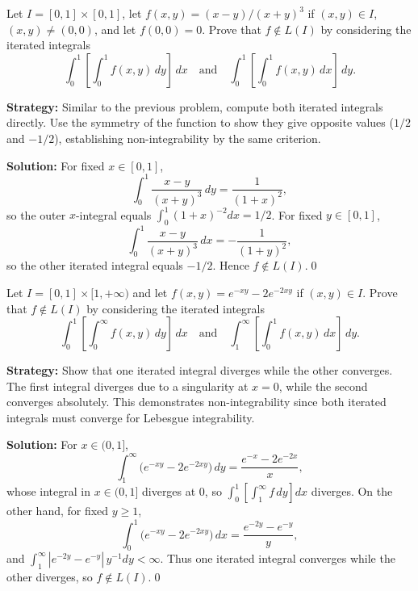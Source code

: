 \begin{problembox}
\begin{problemstatement}
Let \( I = [0, 1] \times [0, 1] \), let \( f(x, y) = (x - y)/(x + y)^3 \) if \( (x, y) \in I \), \( (x, y) \neq (0, 0) \), and let \( f(0, 0) = 0 \). Prove that \( f \notin L(I) \) by considering the iterated integrals
\[
\int_0^1 \left[ \int_0^1 f(x, y) \, dy \right] \, dx \quad \text{and} \quad \int_0^1 \left[ \int_0^1 f(x, y) \, dx \right] \, dy.
\]
\end{problemstatement}
\end{problembox}

\noindent\textbf{Strategy:} Similar to the previous problem, compute both iterated integrals directly. Use the symmetry of the function to show they give opposite values (\(1/2\) and \(-1/2\)), establishing non-integrability by the same criterion.

\bigskip\noindent\textbf{Solution:}
For fixed \(x\in[0,1]\),
\[
\int_0^1 \frac{x-y}{(x+y)^3}\,dy = \frac{1}{(1+x)^{2}},
\]
so the outer \(x\)-integral equals \(\int_0^1 (1+x)^{-2}dx=1/2\). For fixed \(y\in[0,1]\),
\[
\int_0^1 \frac{x-y}{(x+y)^3}\,dx = -\frac{1}{(1+y)^{2}},
\]
so the other iterated integral equals \(-1/2\). Hence \(f\notin L(I)\).\qed


\begin{problembox}
\begin{problemstatement}
Let \( I = [0, 1] \times [1, +\infty) \) and let \( f(x, y) = e^{-xy} - 2e^{-2xy} \) if \( (x, y) \in I \). Prove that \( f \notin L(I) \) by considering the iterated integrals
\[
\int_0^1 \left[ \int_0^\infty f(x, y) \, dy \right] \, dx \quad \text{and} \quad \int_1^\infty \left[ \int_0^1 f(x, y) \, dx \right] \, dy.
\]
\end{problemstatement}
\end{problembox}

\noindent\textbf{Strategy:} Show that one iterated integral diverges while the other converges. The first integral diverges due to a singularity at \(x=0\), while the second converges absolutely. This demonstrates non-integrability since both iterated integrals must converge for Lebesgue integrability.

\bigskip\noindent\textbf{Solution:}
For \(x\in(0,1]\),
\[
\int_1^{\infty} \big(e^{-xy}-2e^{-2xy}\big)\,dy = \frac{e^{-x}-2e^{-2x}}{x},
\]
whose integral in \(x\in(0,1]\) diverges at 0, so \(\int_0^1[\int_1^{\infty} f\,dy]dx\) diverges. On the other hand, for fixed \(y\ge 1\),
\[
\int_0^1 \big(e^{-xy}-2e^{-2xy}\big)\,dx = \frac{e^{-2y}-e^{-y}}{y},
\]
and \(\int_1^{\infty} |e^{-2y}-e^{-y}|\,y^{-1} dy<\infty\). Thus one iterated integral converges while the other diverges, so \(f\notin L(I)\).\qed
